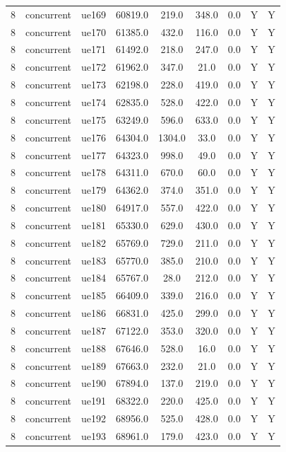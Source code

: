 \begin{table}[ht]
\begin{tabular}{|c|c|c|c|c|c|c|c|c|}
8 & concurrent & ue169 & 60819.0 & 219.0 & 348.0 & 0.0 & Y & Y \\
8 & concurrent & ue170 & 61385.0 & 432.0 & 116.0 & 0.0 & Y & Y \\
8 & concurrent & ue171 & 61492.0 & 218.0 & 247.0 & 0.0 & Y & Y \\
8 & concurrent & ue172 & 61962.0 & 347.0 & 21.0 & 0.0 & Y & Y \\
8 & concurrent & ue173 & 62198.0 & 228.0 & 419.0 & 0.0 & Y & Y \\
8 & concurrent & ue174 & 62835.0 & 528.0 & 422.0 & 0.0 & Y & Y \\
8 & concurrent & ue175 & 63249.0 & 596.0 & 633.0 & 0.0 & Y & Y \\
8 & concurrent & ue176 & 64304.0 & 1304.0 & 33.0 & 0.0 & Y & Y \\
8 & concurrent & ue177 & 64323.0 & 998.0 & 49.0 & 0.0 & Y & Y \\
8 & concurrent & ue178 & 64311.0 & 670.0 & 60.0 & 0.0 & Y & Y \\
8 & concurrent & ue179 & 64362.0 & 374.0 & 351.0 & 0.0 & Y & Y \\
8 & concurrent & ue180 & 64917.0 & 557.0 & 422.0 & 0.0 & Y & Y \\
8 & concurrent & ue181 & 65330.0 & 629.0 & 430.0 & 0.0 & Y & Y \\
8 & concurrent & ue182 & 65769.0 & 729.0 & 211.0 & 0.0 & Y & Y \\
8 & concurrent & ue183 & 65770.0 & 385.0 & 210.0 & 0.0 & Y & Y \\
8 & concurrent & ue184 & 65767.0 & 28.0 & 212.0 & 0.0 & Y & Y \\
8 & concurrent & ue185 & 66409.0 & 339.0 & 216.0 & 0.0 & Y & Y \\
8 & concurrent & ue186 & 66831.0 & 425.0 & 299.0 & 0.0 & Y & Y \\
8 & concurrent & ue187 & 67122.0 & 353.0 & 320.0 & 0.0 & Y & Y \\
8 & concurrent & ue188 & 67646.0 & 528.0 & 16.0 & 0.0 & Y & Y \\
8 & concurrent & ue189 & 67663.0 & 232.0 & 21.0 & 0.0 & Y & Y \\
8 & concurrent & ue190 & 67894.0 & 137.0 & 219.0 & 0.0 & Y & Y \\
8 & concurrent & ue191 & 68322.0 & 220.0 & 425.0 & 0.0 & Y & Y \\
8 & concurrent & ue192 & 68956.0 & 525.0 & 428.0 & 0.0 & Y & Y \\
8 & concurrent & ue193 & 68961.0 & 179.0 & 423.0 & 0.0 & Y & Y \\

\end{tabular}
\end{table}
